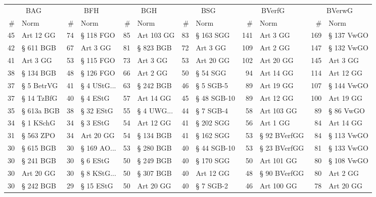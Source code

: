 \begin{tabular}{rlrlrlrlrlrl}
\multicolumn{2}{c}{BAG} & \multicolumn{2}{c}{BFH} & \multicolumn{2}{c}{BGH} & \multicolumn{2}{c}{BSG} & \multicolumn{2}{c}{BVerfG} & \multicolumn{2}{c}{BVerwG} \\
  \# &         Norm &   \# &           Norm &   \# &          Norm &   \# &        Norm &      \# &            Norm &      \# &       Norm \\
\midrule
 45 &    Art 12 GG &  74 &      § 118 FGO &  85 &    Art 103 GG &  83 &   § 163 SGG &    141 &        Art 3 GG &    169 & § 137 VwGO \\
 42 &    § 611 BGB &  67 &       Art 3 GG &  81 &     § 823 BGB &  72 &    Art 3 GG &    109 &        Art 2 GG &    147 & § 132 VwGO \\
 41 &     Art 3 GG &  53 &      § 115 FGO &  73 &      Art 3 GG &  53 &   Art 20 GG &    102 &       Art 20 GG &    145 &   Art 3 GG \\
 38 &    § 134 BGB &  48 &      § 126 FGO &  66 &      Art 2 GG &  50 &    § 54 SGG &     94 &       Art 14 GG &    114 &  Art 12 GG \\
 37 &   § 5 BetrVG &  41 &  § 4 UStG... &  63 &     § 242 BGB &  46 &   § 5 SGB-5 &     89 &       Art 19 GG &    107 & § 144 VwGO \\
 37 &   § 14 TzBfG &  40 &       § 4 EStG &  57 &     Art 14 GG &  45 & § 48 SGB-10 &     89 &       Art 12 GG &    100 &  Art 19 GG \\
 35 &   § 613a BGB &  38 &      § 32 EStG &  55 &  § 4 UWG... &  44 &   § 7 SGB-4 &     58 &      Art 103 GG &     89 &  § 86 VwGO \\
 34 &    § 1 KSchG &  34 &       § 3 EStG &  54 &     Art 12 GG &  41 &   § 202 SGG &     56 &        Art 1 GG &     84 &  Art 14 GG \\
 31 &    § 563 ZPO &  34 &      Art 20 GG &  54 &     § 134 BGB &  41 &   § 162 SGG &     53 &    § 92 BVerfGG &     84 & § 113 VwGO \\
 30 &    § 615 BGB &  30 &  § 169 AO... &  53 &     § 280 BGB &  40 & § 44 SGB-10 &     53 &    § 23 BVerfGG &     81 & § 133 VwGO \\
 30 &    § 241 BGB &  30 &       § 6 EStG &  50 &     § 249 BGB &  40 &   § 170 SGG &     50 &      Art 101 GG &     80 & § 108 VwGO \\
 30 &    Art 20 GG &  30 &  § 8 KStG... &  50 &     § 307 BGB &  40 &   Art 12 GG &     48 &    § 90 BVerfGG &     80 &   Art 2 GG \\
 30 &    § 242 BGB &  29 &      § 15 EStG &  50 &     Art 20 GG &  40 &   § 7 SGB-2 &     46 &      Art 100 GG &     78 &  Art 20 GG \\

\end{tabular}

